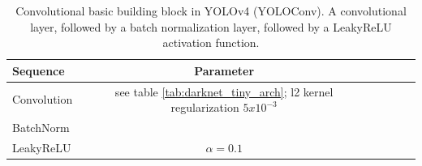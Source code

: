 \begin{table} %
\begin{center}

\begin{tabular}{l|c|c|c|c|c}
    \textbf{Sequence} & \textbf{Parameter}\\
    \hline
    Convolution & see table \ref{tab:darknet_tiny_arch}; l2 kernel regularization $5x10^{-3}$\\
    BatchNorm &\\
    LeakyReLU & $\alpha = 0.1$\\

\end{tabular}
\caption{Convolutional basic building block in YOLOv4 (YOLOConv). A convolutional layer, followed by a batch normalization layer, followed by a LeakyReLU activation function.}
\label{tab:yoloconv}

\end{center}
\end{table}

